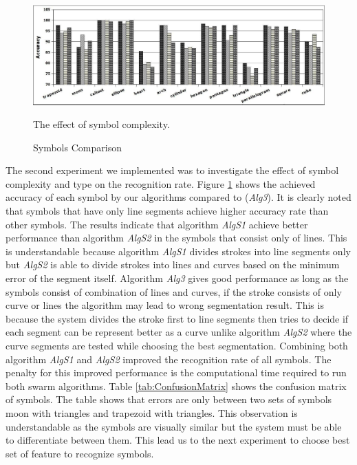 \documentclass{article}
\begin{document}
\begin{figure}
	\centering
		\includegraphics[scale=0.5]{images/testsym.jpg}
	\caption{Symbols Comparison} The effect of symbol complexity.  %
	\label{fig:test2}
\end{figure}  
The second experiment we implemented was to investigate the effect of symbol complexity and type on the recognition rate. Figure \ref{fig:test2} shows the achieved accuracy of each symbol by our algorithms compared to \cite{earlyprocess} (\textsl{Alg3}). It is clearly noted that symbols that have only line segments achieve higher accuracy rate than other symbols. The results indicate that algorithm \textsl{AlgS1} achieve better performance than algorithm \textsl{AlgS2} in the symbols that consist only of lines. This is understandable because algorithm \textsl{AlgS1} divides strokes into line segments only but \textsl{AlgS2} is able to divide strokes into lines and curves based on the minimum error of the segment itself. Algorithm \textsl{Alg3} gives good performance as long as the symbols consist of combination of lines and curves, if the stroke consists of only curve or lines the algorithm may lead to wrong segmentation result. This is because the system divides the stroke first to line segments then tries to decide if each segment can be represent better as a curve unlike algorithm \textsl{AlgS2} where the curve segments are tested while choosing the best segmentation. Combining both algorithm \textsl{AlgS1} and \textsl{AlgS2} improved the recognition rate of all symbols. The penalty for this improved performance is the computational time required to run both swarm algorithms. Table \ref{tab:ConfusionMatrix} shows the confusion matrix of symbols. The table shows that errors are only between two sets of symbols moon with triangles and trapezoid with triangles. This observation is understandable as the symbols are visually similar but the system must be able to differentiate between them. This lead us to the next experiment to choose best set of feature to recognize symbols. 
\begin{table}
	\centering
 
	\caption{Confusion Matrix}
	\label{tab:ConfusionMatrix}
\end{table}
\end{document}
